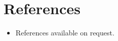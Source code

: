 \documentclass[11pt,a4paper,sans]{moderncv}        %
\begin{document}
\section{References}

\vspace{6pt}
 
\begin{itemize}

\item{References available on request.}

\end{itemize}

% 


\end{document}
